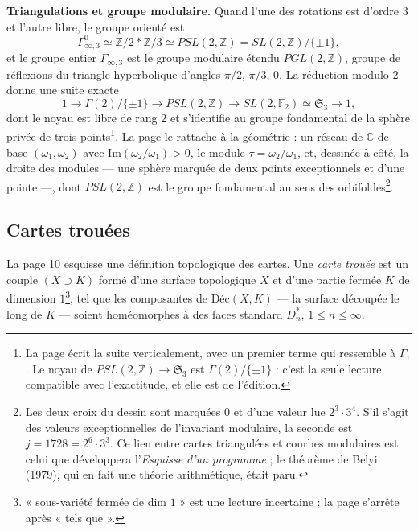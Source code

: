 \documentclass[11pt,a4paper]{article}
\begin{document}
\textbf{Triangulations et groupe modulaire.} Quand l'une des rotations est
d'ordre $3$ et l'autre libre, le groupe orienté est
\[
\Gamma^{0}_{\infty,3} \simeq \mathbb{Z}/2 * \mathbb{Z}/3 \simeq PSL(2, \mathbb{Z}) = SL(2, \mathbb{Z})/\{\pm 1\},
\]
et le groupe entier $\Gamma_{\infty,3}$ est le groupe modulaire étendu
$PGL(2, \mathbb{Z})$, groupe de réflexions du triangle hyperbolique d'angles
$\pi/2$, $\pi/3$, $0$. La réduction modulo $2$ donne une suite exacte
\[
1 \to \Gamma(2)/\{\pm 1\} \longrightarrow PSL(2, \mathbb{Z}) \longrightarrow SL(2, \mathbb{F}_2) \simeq \mathfrak{S}_3 \to 1,
\]
dont le noyau est libre de rang $2$ et s'identifie au groupe fondamental de la
sphère privée de trois points\footnote{La page écrit la suite verticalement,
avec un premier terme qui ressemble à $\Gamma_1$. Le noyau de
$PSL(2,\mathbb{Z}) \to \mathfrak{S}_3$ est $\Gamma(2)/\{\pm 1\}$ : c'est la seule lecture
compatible avec l'exactitude, et elle est de l'édition.}. La page le rattache
à la géométrie : un réseau de $\mathbb{C}$ de base $(\omega_1, \omega_2)$ avec
$\mathrm{Im}(\omega_2/\omega_1) > 0$, le module $\tau = \omega_2/\omega_1$, et, dessinée
à côté, la droite des modules — une sphère marquée de deux points exceptionnels
et d'une pointe —, dont $PSL(2, \mathbb{Z})$ est le groupe fondamental au sens des
orbifoldes\footnote{Les deux croix du dessin sont marquées $0$ et d'une valeur
lue $2^{3}\cdot 3^{4}$. S'il s'agit des valeurs exceptionnelles de l'invariant
modulaire, la seconde est $j = 1728 = 2^{6}\cdot 3^{3}$. Ce lien entre cartes
triangulées et courbes modulaires est celui que développera l'\emph{Esquisse
d'un programme} ; le théorème de Belyi (1979), qui en fait une théorie
arithmétique, était paru.}.

\subsection*{Cartes trouées}

La page 10 esquisse une définition topologique des cartes. Une \emph{carte
trouée} est un couple $(X \supset K)$ formé d'une surface topologique $X$ et
d'une partie fermée $K$ de dimension $1$\footnote{« sous-variété fermée de dim
$1$ » est une lecture incertaine ; la page s'arrête après « tels que ».},
tel que les composantes de $\text{Déc}(X, K)$ — la surface découpée le long de
$K$ — soient homéomorphes à des faces standard $D_n^{*}$, $1 \leq n \leq \infty$.
\end{document}
